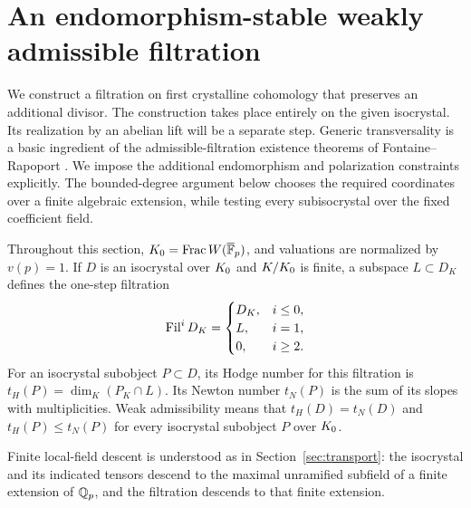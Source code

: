 \section{An endomorphism-stable weakly admissible filtration}
\label{sec:filtration}

We construct a filtration on first crystalline cohomology that preserves an
additional divisor.  The construction takes place entirely on the given
isocrystal.  Its realization by an abelian lift will be a separate step.
Generic transversality is a basic ingredient of the admissible-filtration
existence theorems of Fontaine--Rapoport
\cite[Theorem~1 and Lemmas~1.1--1.2]{FontaineRapoport2005}.
We impose the additional endomorphism and polarization constraints
explicitly. The bounded-degree argument below chooses the required
coordinates over a finite algebraic extension, while testing every
subisocrystal over the fixed coefficient field.

Throughout this section, $K_0=\operatorname{Frac}W(\overline{\mathbb F}_p)$,
and valuations are normalized by $v(p)=1$.  If $D$ is an isocrystal over
$K_0$ and $K/K_0$ is finite, a subspace $L\subset D_K$ defines the
one-step filtration
\[
 \operatorname{Fil}^iD_K=
 \begin{cases}
 D_K,&i\leq 0,\\
 L,&i=1,\\
 0,&i\geq 2.
 \end{cases}
\]
For an isocrystal subobject $P\subset D$, its Hodge number for this
filtration is $t_H(P)=\dim_K(P_K\cap L)$.  Its Newton number $t_N(P)$ is
the sum of its slopes with multiplicities.  Weak admissibility means that
$t_H(D)=t_N(D)$ and $t_H(P)\leq t_N(P)$ for every isocrystal subobject
$P$ over $K_0$.

Finite local-field descent is understood as in Section~\ref{sec:transport}:
the isocrystal and its indicated tensors descend to the maximal unramified
subfield of a finite extension of \(\mathbb Q_p\), and the filtration descends
to that finite extension.

